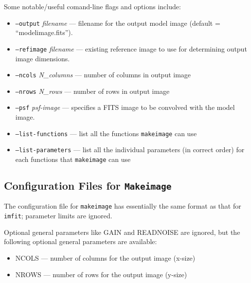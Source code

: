 \documentclass[10pt]{article}
\newcommand{\imfit}{\texttt{imfit}}
\newcommand{\makeimage}{\texttt{makeimage}}
\newcommand{\Makeimage}{\texttt{Makeimage}}
\begin{document}
\bigskip

Some notable/useful comand-line flags and options include:
\begin{itemize}
\item \texttt{--output} \textit{filename} --- filename for the output model
image (default = ``modelimage.fits'').

\item \texttt{--refimage} \textit{filename} --- existing reference image to
use for determining output image dimensions.

\item \texttt{--ncols} \textit{N\_columns} --- number of columns in output image

\item \texttt{--nrows} \textit{N\_rows} --- number of rows in output image

\bigskip

\item \texttt{--psf} \textit{psf-image} --- specifies a FITS image to be convolved
with the model image.

\bigskip

\item \texttt{--list-functions} --- list all the functions \makeimage{}
can use

\item \texttt{--list-parameters} --- list all the individual parameters (in correct order)
for each functions that \makeimage{} can use



\end{itemize}



\subsection{Configuration Files for \Makeimage{}}

The configuration file for \makeimage{} has essentially the same format as
that for \imfit; parameter limits are ignored.

Optional general parameters like GAIN and READNOISE are ignored, but the
following optional general parameters are available:

\begin{itemize}
\item NCOLS --- number of columns for the output image (x-size)

\item NROWS --- number of rows for the output image (y-size)

\end{itemize}
\end{document}
